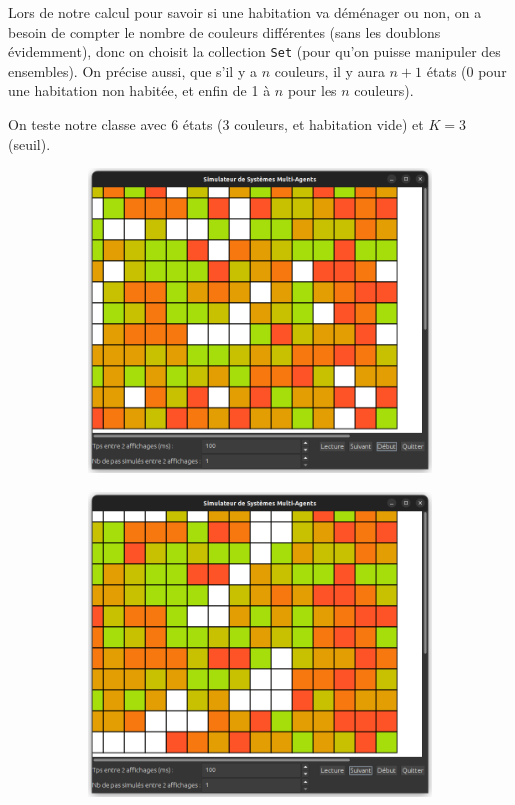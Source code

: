 \documentclass[a4paper, 11pt, french]{article}
\begin{document}
Lors de notre calcul pour savoir si une habitation va déménager ou non, on a besoin de compter le nombre de couleurs différentes (sans les doublons évidemment), donc on choisit la collection \verb|Set| (pour qu'on puisse manipuler des ensembles). On précise aussi, que s'il y a $n$ couleurs, il y aura $n+1$ états (0 pour une habitation non habitée, et enfin de 1 à $n$ pour les $n$ couleurs).

On teste notre classe avec 6 états (3 couleurs, et habitation vide) et $K=3$ (seuil).

\begin{figure}[H]
\centering
\begin{subfigure}{0.3\textwidth}
    \includegraphics[width=\textwidth]{TestSchelling1.png}
\end{subfigure}
\hfill
\begin{subfigure}{0.3\textwidth}
    \includegraphics[width=\textwidth]{TestSchelling2.png}

\end{subfigure}
\end{figure}
\end{document}
